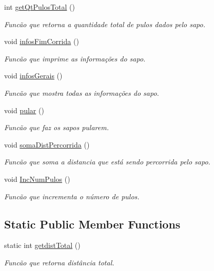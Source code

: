\begin{DoxyCompactItemize}
int \hyperlink{classsapo_a8198a0fd01026364e622c575794ba21b}{get\+Qt\+Pulos\+Total} ()
\begin{DoxyCompactList}\small\item\em Funcão que retorna a quantidade total de pulos dados pelo sapo. \end{DoxyCompactList}\item 
void \hyperlink{classsapo_a9ea3baab72c086e5150fd105b6efa184}{infos\+Fim\+Corrida} ()
\begin{DoxyCompactList}\small\item\em Funcão que imprime as informações do sapo. \end{DoxyCompactList}\item 
void \hyperlink{classsapo_a9e0142ce465e675144ddd413e42b2f0b}{infos\+Gerais} ()\hypertarget{classsapo_a9e0142ce465e675144ddd413e42b2f0b}{}\label{classsapo_a9e0142ce465e675144ddd413e42b2f0b}

\begin{DoxyCompactList}\small\item\em Funcão que mostra todas as informações do sapo. \end{DoxyCompactList}\item 
void \hyperlink{classsapo_ab0ffc38df516a76e8a783f9f668ef0d3}{pular} ()
\begin{DoxyCompactList}\small\item\em Funcão que faz os sapos pularem. \end{DoxyCompactList}\item 
void \hyperlink{classsapo_a93c5ae4dc324de1a6f236627a681d5b5}{soma\+Dist\+Percorrida} ()\hypertarget{classsapo_a93c5ae4dc324de1a6f236627a681d5b5}{}\label{classsapo_a93c5ae4dc324de1a6f236627a681d5b5}

\begin{DoxyCompactList}\small\item\em Funcão que soma a distancia que está sendo percorrida pelo sapo. \end{DoxyCompactList}\item 
void \hyperlink{classsapo_a0475e33557c7a3fcfb5b26f4f9ee8e99}{Inc\+Num\+Pulos} ()
\begin{DoxyCompactList}\small\item\em Funcão que incrementa o número de pulos. \end{DoxyCompactList}\end{DoxyCompactItemize}
\subsection*{Static Public Member Functions}
\begin{DoxyCompactItemize}
\item 
static int \hyperlink{classsapo_a17bf33d6846912f31adf3c2ed143f9e7}{getdist\+Total} ()
\begin{DoxyCompactList}\small\item\em Funcão que retorna distância total. \end{DoxyCompactList}\end{DoxyCompactItemize}
